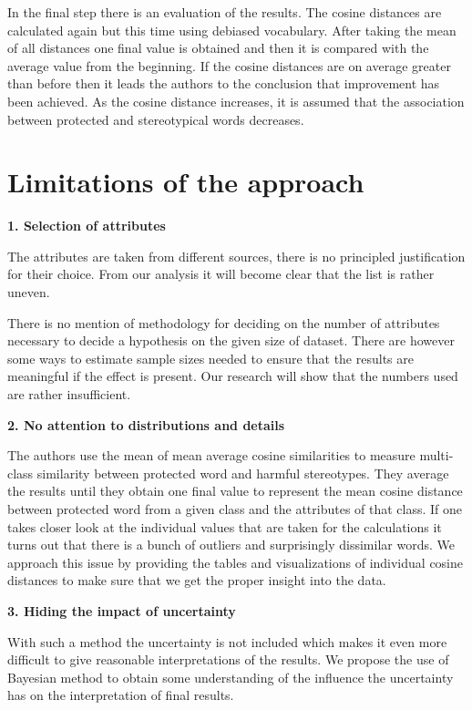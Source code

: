 \documentclass[12pt,]{book}
\begin{document}
In the final step there is an evaluation of the results. The cosine
distances are calculated again but this time using debiased vocabulary.
After taking the mean of all distances one final value is obtained and
then it is compared with the average value from the beginning. If the
cosine distances are on average greater than before then it leads the
authors to the conclusion that improvement has been achieved. As the
cosine distance increases, it is assumed that the association between
protected and stereotypical words decreases.

\section{Limitations of the approach}\label{limitations-of-the-approach}

\textbf{1. Selection of attributes}

The attributes are taken from different sources, there is no principled
justification for their choice. From our analysis it will become clear
that the list is rather uneven.

There is no mention of methodology for deciding on the number of
attributes necessary to decide a hypothesis on the given size of
dataset. There are however some ways to estimate sample sizes needed to
ensure that the results are meaningful if the effect is present. Our
research will show that the numbers used are rather insufficient.

\textbf{2. No attention to distributions and details}

The authors use the mean of mean average cosine similarities to measure
multi-class similarity between protected word and harmful stereotypes.
They average the results until they obtain one final value to represent
the mean cosine distance between protected word from a given class and
the attributes of that class. If one takes closer look at the individual
values that are taken for the calculations it turns out that there is a
bunch of outliers and surprisingly dissimilar words. We approach this
issue by providing the tables and visualizations of individual cosine
distances to make sure that we get the proper insight into the data.

\textbf{3. Hiding the impact of uncertainty}

With such a method the uncertainty is not included which makes it even
more difficult to give reasonable interpretations of the results. We
propose the use of Bayesian method to obtain some understanding of the
influence the uncertainty has on the interpretation of final results.
\end{document}
